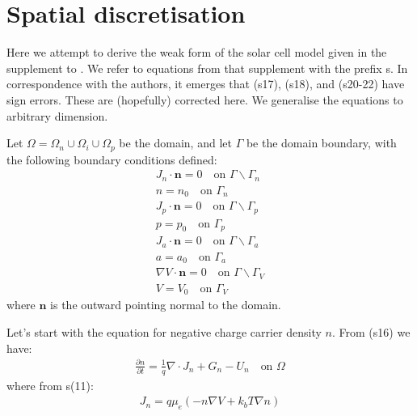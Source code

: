 \documentclass[a4paper,11pt]{article}
\renewcommand{\vec}[1]{\mathbf{#1}}
\begin{document}
\section{Spatial discretisation}

Here we attempt to derive the weak form of the solar cell model given in the
supplement to \cite{Calado2016}. We refer to equations from that supplement
with the prefix s. In correspondence with the authors, it emerges that
(s17), (s18), and (s20-22) have sign errors. These are (hopefully) corrected here.
We generalise the equations to arbitrary dimension. 

Let $\Omega = \Omega_n \cup \Omega_i \cup \Omega_p$ be the domain, and let
$\Gamma$ be the domain boundary, with the following boundary conditions
defined:
\begin{gather}
  J_n\cdot\vec{n} = 0 \quad\textrm{on }\Gamma\backslash\Gamma_n\\
  n = n_0 \quad\textrm{on }\Gamma_n\\
  J_p\cdot\vec{n} = 0 \quad\textrm{on }\Gamma\backslash\Gamma_p\\
  p = p_0 \quad\textrm{on }\Gamma_p\\
  J_a\cdot\vec{n} = 0 \quad\textrm{on }\Gamma\backslash\Gamma_a\\
  a = a_0 \quad\textrm{on }\Gamma_a\\
  \nabla V\cdot\vec{n} = 0 \quad\textrm{on }\Gamma\backslash\Gamma_V\\
  V = V_0 \quad\textrm{on }\Gamma_V
\end{gather}
where $\vec{n}$ is the outward pointing normal to the domain.

Let's start with the equation for negative charge carrier density $n$. From (s16) we have:
\begin{align}
  \frac{\partial n}{\partial t} = \frac{1}{q}\nabla\cdot J_n + G_n - U_n \quad \textrm{on
  }\Omega
\end{align}
where from s(11):
\begin{align}
  J_n =  q\mu_e(-n\nabla V + k_b T \nabla n) \label{nflux}
\end{align}
\end{document}
